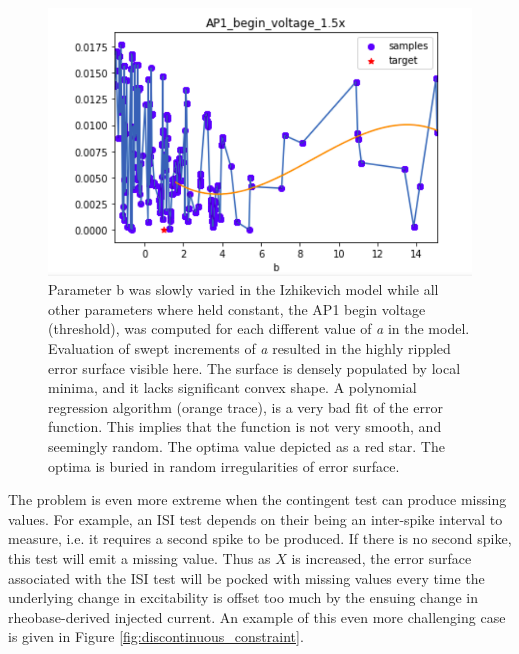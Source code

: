 \begin{figure}
\centering
      \includegraphics[scale=0.85]{figures/parameter_b_hopeless_surface.png}
      \caption[Cross section of an objective function that harms efficient optimization]{Parameter b was slowly varied in the Izhikevich model while all other parameters where held constant, the AP1 begin voltage (threshold), was computed for each different value of \emph{a} in the model. Evaluation of swept increments of \emph{a} resulted in the highly rippled error surface visible here. The surface is densely populated by local minima, and it lacks significant convex shape. A polynomial regression algorithm (orange trace), is a very bad fit of the error function. This implies that the function is not very smooth, and seemingly random. The optima value depicted as a red star. The optima is buried in random irregularities of error surface.
    }
      \label{fig:probably_smooth_constraint}
\end{figure}

The problem is even more extreme when the contingent test can produce missing values.
For example, an ISI test depends on their being an inter-spike interval to measure, i.e. it requires a second spike to be produced.
If there is no second spike, this test will emit a missing value.
Thus as $X$ is increased, the error surface associated with the ISI test will be pocked with missing values every time the underlying change in excitability is offset too much by the ensuing change in rheobase-derived injected current.
An example of this even more challenging case is given in Figure \ref{fig:discontinuous_constraint}.

